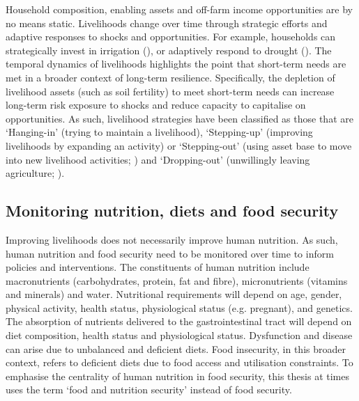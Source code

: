 Household composition, enabling assets and off-farm income opportunities are by no means static. Livelihoods change over time
through strategic efforts and adaptive responses to shocks and opportunities. For example, households can strategically invest in irrigation (\citealp{Nakawuka2017}), or adaptively respond to drought (\citealp{Ulrich2012241}). The temporal dynamics of livelihoods highlights the point that short-term needs are met in a broader context of long-term resilience. Specifically, the depletion of livelihood assets (such as soil fertility) to meet short-term needs can increase long-term risk exposure to shocks and reduce capacity to capitalise on opportunities. As such, livelihood strategies have been classified as those that are `Hanging-in' (trying to maintain a livelihood), `Stepping-up' (improving livelihoods by expanding an activity) or `Stepping-out' (using asset base to move into new livelihood activities; \citealp{Dorward2009}) and `Dropping-out' (unwillingly leaving agriculture; \citealp{Valbuena20151395}).

\subsection{Monitoring nutrition, diets and food security}

Improving livelihoods does not necessarily improve human nutrition. As such, human nutrition and food security need to be monitored over time to inform policies and interventions. The constituents of human nutrition include macronutrients (carbohydrates, protein, fat and fibre), micronutrients (vitamins and minerals) and water. Nutritional requirements will depend on age, gender, physical activity, health status, physiological status (e.g. pregnant), and genetics. The absorption of nutrients delivered to the gastrointestinal tract will depend on diet composition, health status and physiological status. Dysfunction and disease can arise due to unbalanced and deficient diets. Food insecurity, in this broader context, refers to deficient diets due to food access and utilisation constraints. To emphasise the centrality of human nutrition in food security, this thesis at times uses the term `food and nutrition security' instead of food security.


